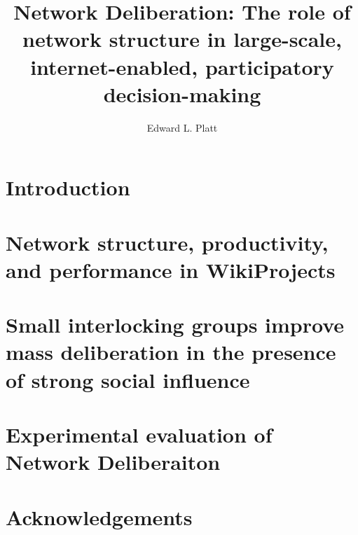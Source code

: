 \documentclass{report}
\author{Edward L. Platt}
\title{Network Deliberation: The role of network structure in large-scale, internet-enabled, participatory decision-making}
\newcommand{\+}{\phantom{-}}
\begin{document}
\maketitle

\begin{abstract}

\end{abstract}

\tableofcontents

\chapter{Introduction}


\chapter{Network structure, productivity, and performance in WikiProjects}


\chapter{Small interlocking groups improve mass deliberation in the presence
of strong social influence}


\chapter{Experimental evaluation of Network Deliberaiton}

\chapter*{Acknowledgements}
%




\nocite{*}


\end{document}
